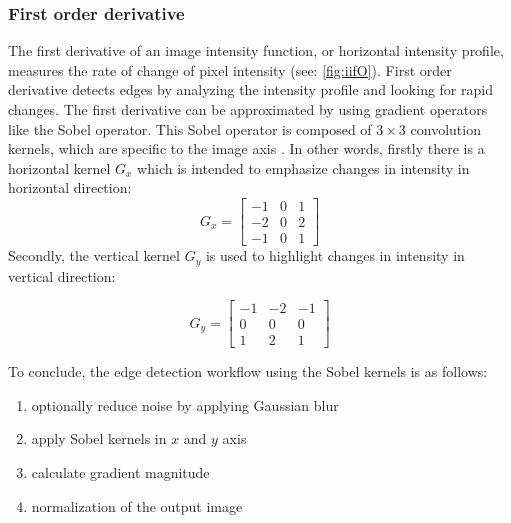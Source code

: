 \subsubsection*{First order derivative}
The first derivative of an image intensity function, or horizontal intensity profile,
measures the rate of change of pixel intensity (see: \cref{fig:iifO}).
First order derivative detects edges by analyzing the intensity profile and looking for rapid changes.
The first derivative can be approximated by using gradient operators like the Sobel operator.
This Sobel operator is composed of $3 \times 3$ convolution kernels,
which are specific to the image axis \cite{gonzalezDigitalImageProcessing2007}.
In other words, firstly there is a horizontal kernel $G_{x}$ which is intended to emphasize changes in
intensity in horizontal direction:
\begin{equation}
	G_{x} =
	\begin{bmatrix}
		-1 & 0 & 1 \\
		-2 & 0 & 2 \\
		-1 & 0 & 1
	\end{bmatrix}
\end{equation}
\noindent
Secondly, the vertical kernel $G_{y}$ is used to highlight changes in intensity in vertical direction:

\begin{equation}
	G_{y} =
	\begin{bmatrix}
		-1 & -2 & -1 \\
		0  & 0  & 0  \\
		1  & 2  & 1
	\end{bmatrix}
\end{equation}

\noindent
To conclude, the edge detection workflow using the Sobel kernels is as follows:
\begin{enumerate}
	\item optionally reduce noise by applying Gaussian blur
	\item apply Sobel kernels in $x$ and $y$ axis
	\item calculate gradient magnitude %
	\item normalization of the output image
\end{enumerate}

